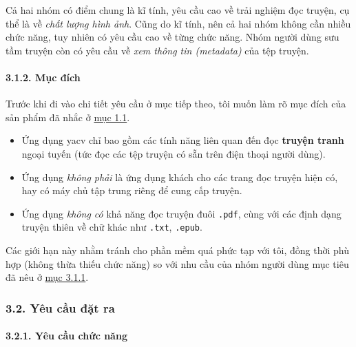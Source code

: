 Cả hai nhóm có điểm chung là kĩ tính, yêu cầu cao về trải nghiệm đọc
truyện, cụ thể là về \emph{chất lượng hình ảnh}. Cũng do kĩ tính, nên cả
hai nhóm không cần nhiều chức năng, tuy nhiên có yêu cầu cao về từng
chức năng. Nhóm người dùng sưu tầm truyện còn có yêu cầu về \emph{xem
  thông tin (metadata)} của tệp truyện.

\hypertarget{mux1ee5c-ux111uxedch}{%
  \paragraph{\texorpdfstring{3.1.2. Mục đích
    }{3.1.2. Mục đích }}\label{mux1ee5c-ux111uxedch}}

Trước khi đi vào chi tiết yêu cầu ở mục tiếp theo, tôi muốn làm rõ mục
đích của sản phẩm đã nhắc ở \protect\hyperlink{P1.1-background}{mục
  1.1}.

\begin{itemize}
  
  \item
        Ứng dụng yacv chỉ bao gồm các tính năng liên quan đến đọc
        \textbf{truyện tranh} ngoại tuyến (tức đọc các tệp truyện có sẵn trên
        điện thoại người dùng).
  \item
        Ứng dụng \emph{không phải} là ứng dụng khách cho các trang đọc truyện
        hiện có, hay có máy chủ tập trung riêng để cung cấp truyện.
  \item
        Ứng dụng \emph{không có} khả năng đọc truyện đuôi \texttt{.pdf}, cùng
        với các định dạng truyện thiên về chữ khác như \texttt{.txt},
        \texttt{.epub}.
\end{itemize}

Các giới hạn này nhằm tránh cho phần mềm quá phức tạp với tôi, đồng thời
phù hợp (không thừa thiếu chức năng) so với nhu cầu của nhóm người dùng
mục tiêu đã nêu ở \protect\hyperlink{P3.1.1-users}{mục 3.1.1}.

\hypertarget{yuxeau-cux1ea7u-ux111ux1eb7t-ra}{%
  \subsubsection{\texorpdfstring{3.2. Yêu cầu đặt ra
    }{3.2. Yêu cầu đặt ra }}\label{yuxeau-cux1ea7u-ux111ux1eb7t-ra}}

\hypertarget{yuxeau-cux1ea7u-chux1ee9c-nux103ng}{%
  \paragraph{\texorpdfstring{3.2.1. Yêu cầu chức năng
    }{3.2.1. Yêu cầu chức năng }}\label{yuxeau-cux1ea7u-chux1ee9c-nux103ng}}

